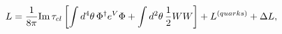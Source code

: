 \begin{equation}
{  L} =     {1\over 8 \pi} {\hbox{\rm Im}}   \, \tau_{cl} \left[\int d^4 \theta \,
\Phi^{\dagger} e^V \Phi +\int d^2 \theta\,{1\over 2} W W\right]
+ { L}^{(quarks)} + \Delta { L},
\end{equation}


